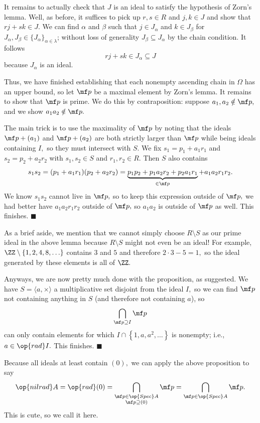 It remains to actually check that $J$ is an ideal to satisfy the hypothesis of Zorn's lemma. Well, as before, it suffices to pick up $r,s\in R$ and $j,k\in J$ and show that $rj+sk\in J.$ We can find $\alpha$ and $\beta$ such that $j\in J_\alpha$ and $k\in J_\beta$ for $J_\alpha,J_\beta\in\{J_\alpha\}_{\alpha\in\lambda}$; without loss of generality $J_\beta\subseteq J_\alpha$ by the chain condition. It follows
\[rj+sk\in J_\alpha\subseteq J\]
because $J_\alpha$ is an ideal.

Thus, we have finished establishing that each nonempty ascending chain in $\Omega$ has an upper bound, so let $\mf p$ be a maximal element by Zorn's lemma. It remains to show that $\mf p$ is prime. We do this by contraposition: suppose $a_1,a_2\notin\mf p,$ and we show $a_1a_2\notin\mf p.$

The main trick is to use the maximality of $\mf p$ by noting that the ideals $\mf p+(a_1)$ and $\mf p+(a_2)$ are both strictly larger than $\mf p$ while being ideals containing $I,$ so they must intersect with $S.$ We fix $s_1=p_1+a_1r_1$ and $s_2=p_2+a_2r_2$ with $s_1,s_2\in S$ and $r_1,r_2\in R.$ Then $S$ also contains
\[s_1s_2=(p_1+a_1r_1)(p_2+a_2r_2)=\underbrace{p_1p_2+p_1a_2r_2+p_2a_1r_1}_{\in\mf p}+a_1a_2r_1r_2.\]
We know $s_1s_2$ cannot live in $\mf p,$ so to keep this expression outside of $\mf p,$ we had better have $a_1a_2r_1r_2$ outside of $\mf p,$ so $a_1a_2$ is outside of $\mf p$ as well. This finishes. $\blacksquare$

As a brief aside, we mention that we cannot simply choose $R\setminus S$ as our prime ideal in the above lemma because $R\setminus S$ might not even be an ideal! For example, $\ZZ\setminus\{1,2,4,8,\ldots\}$ contains $3$ and $5$ and therefore $2\cdot3-5=1,$ so the ideal generated by these elements is all of $\ZZ.$

Anyways, we are now pretty much done with the proposition, as suggested. We have $S=\langle a,\times\rangle$ a multiplicative set disjoint from the ideal $I,$ so we can find $\mf p$ not containing anything in $S$ (and therefore not containing $a$), so
\[\bigcap_{\mf p\supseteq I}\mf p\]
can only contain elements for which $I\cap\left\{1,a,a^2,\ldots\right\}$ is nonempty; i.e., $a\in\op{rad}I.$ This finishes. $\blacksquare$

Because all ideals at least contain $(0),$ we can apply the above proposition to say
\[\op{nilrad}A=\op{rad}(0)=\bigcap_{\substack{\mf p\in\op{Spec}A\\\mf p\supseteq(0)}}\mf p=\bigcap_{\mf p\in\op{Spec}A}\mf p.\]
This is cute, so we call it here.

